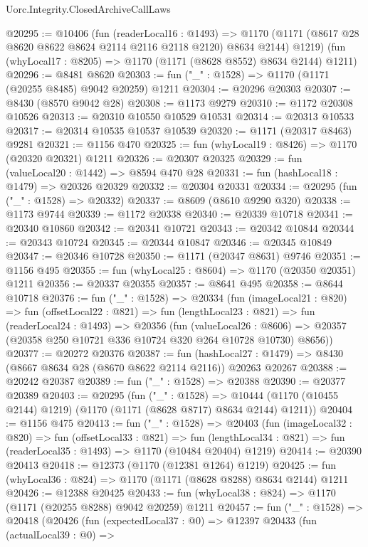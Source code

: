\begin{lexlean}{Uorc.Integrity.ClosedArchiveCallLaws}
\begin{coremodule}
@20295 := @10406
    (fun (readerLocal16 : @1493) =>
    @1170 (@1171 (@8617 @28 @8620 @8622 @8624 @2114 @2116 @2118 @2120) @8634 @2144) @1219)
    (fun (whyLocal17 : @8205) => @1170 (@1171 (@8628 @8552) @8634 @2144) @1211)
@20296 := @8481 @8620
@20303 := fun ("_" : @1528) => @1170 (@1171 (@20255 @8485) @9042 @20259) @1211
@20304 := @20296 @20303
@20307 := @8430 (@8570 @9042 @28)
@20308 := @1173 @9279
@20310 := @1172 @20308 @10526
@20313 := @20310 @10550 @10529 @10531
@20314 := @20313 @10533
@20317 := @20314 @10535 @10537 @10539
@20320 := @1171 (@20317 @8463) @9281
@20321 := @1156 @470
@20325 := fun (whyLocal19 : @8426) => @1170 (@20320 @20321) @1211
@20326 := @20307 @20325
@20329 := fun (valueLocal20 : @1442) => @8594 @470 @28
@20331 := fun (hashLocal18 : @1479) => @20326 @20329
@20332 := @20304 @20331
@20334 := @20295 (fun ("_" : @1528) => @20332)
@20337 := @8609 (@8610 @9290 @320)
@20338 := @1173 @9744
@20339 := @1172 @20338
@20340 := @20339 @10718
@20341 := @20340 @10860
@20342 := @20341 @10721
@20343 := @20342 @10844
@20344 := @20343 @10724
@20345 := @20344 @10847
@20346 := @20345 @10849
@20347 := @20346 @10728
@20350 := @1171 (@20347 @8631) @9746
@20351 := @1156 @495
@20355 := fun (whyLocal25 : @8604) => @1170 (@20350 @20351) @1211
@20356 := @20337 @20355
@20357 := @8641 @495
@20358 := @8644 @10718
@20376 := fun ("_" : @1528) =>
  @20334
    (fun (imageLocal21 : @820) =>
    fun (offsetLocal22 : @821) =>
    fun (lengthLocal23 : @821) =>
    fun (readerLocal24 : @1493) =>
    @20356
      (fun (valueLocal26 : @8606) =>
      @20357 (@20358 @250 @10721 @336 @10724 @320 @264 @10728 @10730) @8656))
@20377 := @20272 @20376
@20387 := fun (hashLocal27 : @1479) =>
  @8430 (@8667 @8634 @28 (@8670 @8622 @2114 @2116)) @20263 @20267
@20388 := @20242 @20387
@20389 := fun ("_" : @1528) => @20388
@20390 := @20377 @20389
@20403 := @20295
    (fun ("_" : @1528) =>
    @10444 (@1170 (@10455 @2144) @1219) (@1170 (@1171 (@8628 @8717) @8634 @2144) @1211))
@20404 := @1156 @475
@20413 := fun ("_" : @1528) =>
  @20403
    (fun (imageLocal32 : @820) =>
    fun (offsetLocal33 : @821) =>
    fun (lengthLocal34 : @821) => fun (readerLocal35 : @1493) => @1170 (@10484 @20404) @1219)
@20414 := @20390 @20413
@20418 := @12373 (@1170 (@12381 @1264) @1219)
@20425 := fun (whyLocal36 : @824) => @1170 (@1171 (@8628 @8288) @8634 @2144) @1211
@20426 := @12388 @20425
@20433 := fun (whyLocal38 : @824) => @1170 (@1171 (@20255 @8288) @9042 @20259) @1211
@20457 := fun ("_" : @1528) =>
  @20418
    (@20426
      (fun (expectedLocal37 : @0) =>
      @12397
        @20433
        (fun (actualLocal39 : @0) =>

\end{coremodule}
\end{lexlean}
